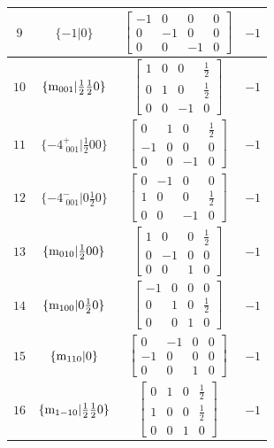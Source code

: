 \documentclass[fleqn,8pt]{jsarticle}
\begin{document}
\begin{longtable}{cccc}
$ 9 $ & $ \{-1|0\} $ & $ \begin{bmatrix} -1 & 0 & 0 & 0 \\ 0 & -1 & 0 & 0 \\ 0 & 0 & -1 & 0 \end{bmatrix} $ & $ -1 $ \\ \hline
$ 10 $ & $ \{{\rm m}_{001}|\frac{1}{2} \frac{1}{2} 0\} $ & $ \begin{bmatrix} 1 & 0 & 0 & \frac{1}{2} \\ 0 & 1 & 0 & \frac{1}{2} \\ 0 & 0 & -1 & 0 \end{bmatrix} $ & $ -1 $ \\ \hline
$ 11 $ & $ \{-4^{+}_{\,\,001}|\frac{1}{2} 0 0\} $ & $ \begin{bmatrix} 0 & 1 & 0 & \frac{1}{2} \\ -1 & 0 & 0 & 0 \\ 0 & 0 & -1 & 0 \end{bmatrix} $ & $ -1 $ \\ \hline
$ 12 $ & $ \{-4^{-}_{\,\,001}|0 \frac{1}{2} 0\} $ & $ \begin{bmatrix} 0 & -1 & 0 & 0 \\ 1 & 0 & 0 & \frac{1}{2} \\ 0 & 0 & -1 & 0 \end{bmatrix} $ & $ -1 $ \\ \hline
$ 13 $ & $ \{{\rm m}_{010}|\frac{1}{2} 0 0\} $ & $ \begin{bmatrix} 1 & 0 & 0 & \frac{1}{2} \\ 0 & -1 & 0 & 0 \\ 0 & 0 & 1 & 0 \end{bmatrix} $ & $ -1 $ \\ \hline
$ 14 $ & $ \{{\rm m}_{100}|0 \frac{1}{2} 0\} $ & $ \begin{bmatrix} -1 & 0 & 0 & 0 \\ 0 & 1 & 0 & \frac{1}{2} \\ 0 & 0 & 1 & 0 \end{bmatrix} $ & $ -1 $ \\ \hline
$ 15 $ & $ \{{\rm m}_{110}|0\} $ & $ \begin{bmatrix} 0 & -1 & 0 & 0 \\ -1 & 0 & 0 & 0 \\ 0 & 0 & 1 & 0 \end{bmatrix} $ & $ -1 $ \\ \hline
$ 16 $ & $ \{{\rm m}_{1-10}|\frac{1}{2} \frac{1}{2} 0\} $ & $ \begin{bmatrix} 0 & 1 & 0 & \frac{1}{2} \\ 1 & 0 & 0 & \frac{1}{2} \\ 0 & 0 & 1 & 0 \end{bmatrix} $ & $ -1 $ \\
\end{longtable}
\end{document}
